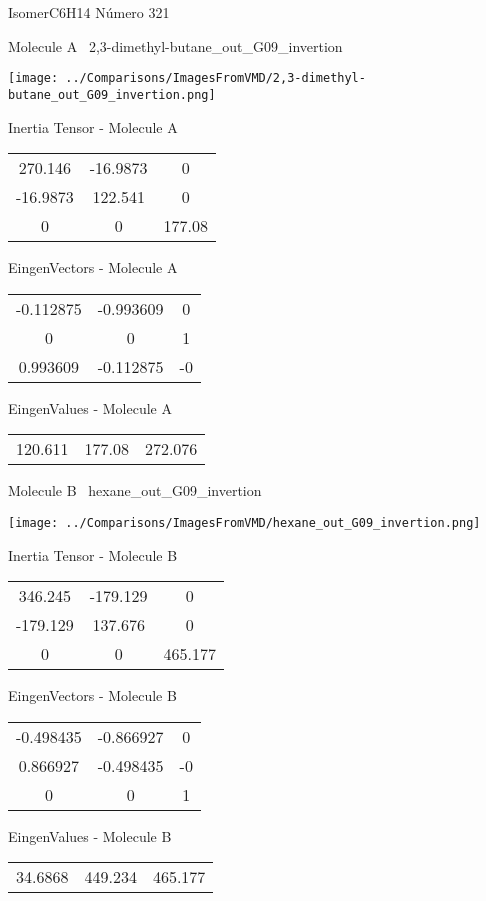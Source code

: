 \vtab[-3cm]
\begin{center}
{\large IsomerC6H14 \tab Número 321}
\end{center}
\begin{multicols}{2}
\begin{center}

Molecule A \
2,3-dimethyl-butane\_out\_G09\_invertion

\texttt{[image: ../Comparisons/ImagesFromVMD/2,3-dimethyl-butane\_out\_G09\_invertion.png]}

Inertia Tensor - Molecule A \\
\begin{tabular}{|c c c|}
270.146	 & 	-16.9873	 & 	0	 \\
-16.9873	 & 	122.541	 & 	0	 \\
0	 & 	0	 & 	177.08
\end{tabular}

\vtab
 EingenVectors - Molecule A     \\
\begin{tabular}{|c c c|}
-0.112875	 & 	-0.993609	 & 	0	 \\
0	 & 	0	 & 	1	 \\
0.993609	 & 	-0.112875	 & 	-0
\end{tabular}

\vtab
 EingenValues - Molecule A     \\
\begin{tabular}{|c c c|}
120.611	 & 	177.08	 & 	272.076	 \\
\end{tabular}
\columnbreak

Molecule B \
hexane\_out\_G09\_invertion

\texttt{[image: ../Comparisons/ImagesFromVMD/hexane\_out\_G09\_invertion.png]}

Inertia Tensor - Molecule B \\
\begin{tabular}{|c c c|}
346.245	 & 	-179.129	 & 	0	 \\
-179.129	 & 	137.676	 & 	0	 \\
0	 & 	0	 & 	465.177
\end{tabular}

\vtab
 EingenVectors - Molecule B     \\
\begin{tabular}{|c c c|}
-0.498435	 & 	-0.866927	 & 	0	 \\
0.866927	 & 	-0.498435	 & 	-0	 \\
0	 & 	0	 & 	1
\end{tabular}

\vtab
 EingenValues - Molecule B     \\
\begin{tabular}{|c c c|}
34.6868	 & 	449.234	 & 	465.177	 \\
\end{tabular}

\end{center}
\end{multicols}

